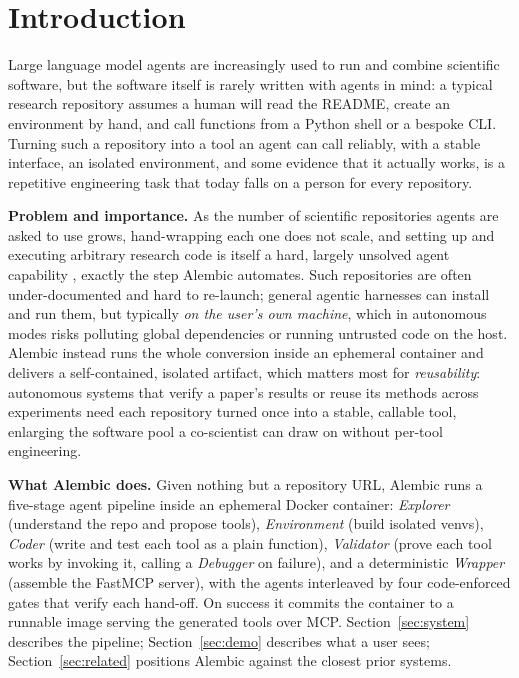 \section{Introduction}
\label{sec:intro}

Large language model agents are increasingly used to run and combine scientific software, but the software itself is rarely written with agents in mind: a typical research repository assumes a human will read the README, create an environment by hand, and call functions from a Python shell or a bespoke CLI. Turning such a repository into a tool an agent can call reliably, with a stable interface, an isolated environment, and some evidence that it actually works, is a repetitive engineering task that today falls on a person for every repository.

\textbf{Problem and importance.} As the number of scientific repositories agents are asked to use grows, hand-wrapping each one does not scale, and setting up and executing arbitrary research code is itself a hard, largely unsolved agent capability \citep{super2024,corebench2024,astabench2025,researchenvbench2026}, exactly the step Alembic automates. Such repositories are often under-documented and hard to re-launch; general agentic harnesses can install and run them, but typically \emph{on the user's own machine}, which in autonomous modes risks polluting global dependencies or running untrusted code on the host. Alembic instead runs the whole conversion inside an ephemeral container and delivers a self-contained, isolated artifact, which matters most for \emph{reusability}: autonomous systems that verify a paper's results or reuse its methods across experiments need each repository turned once into a stable, callable tool, enlarging the software pool a co-scientist can draw on without per-tool engineering.

\textbf{What Alembic does.} Given nothing but a repository URL, Alembic runs a five-stage agent pipeline inside an ephemeral Docker container: \emph{Explorer} (understand the repo and propose tools), \emph{Environment} (build isolated venvs), \emph{Coder} (write and test each tool as a plain function), \emph{Validator} (prove each tool works by invoking it, calling a \emph{Debugger} on failure), and a deterministic \emph{Wrapper} (assemble the FastMCP server), with the agents interleaved by four code-enforced gates that verify each hand-off. On success it commits the container to a runnable image serving the generated tools over MCP. Section~\ref{sec:system} describes the pipeline; Section~\ref{sec:demo} describes what a user sees; Section~\ref{sec:related} positions Alembic against the closest prior systems.

